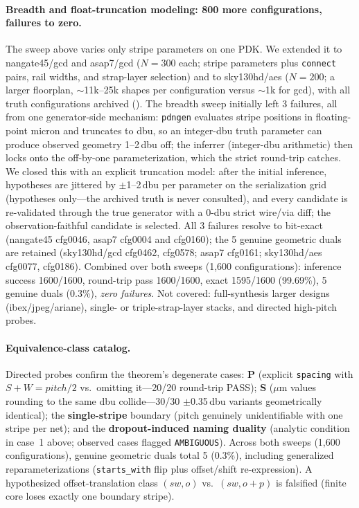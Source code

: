 \documentclass[11pt]{article}
\begin{document}
\paragraph{Breadth and float-truncation modeling: 800 more
configurations, failures to zero.}  The sweep above varies only stripe
parameters on one PDK.  We extended it to nangate45/gcd and asap7/gcd
($N=300$ each; stripe parameters plus \texttt{connect} pairs, rail
widths, and strap-layer selection) and to sky130hd/aes ($N=200$; a
larger floorplan, $\sim$11k--25k shapes per configuration versus
$\sim$1k for gcd), with all truth configurations archived
().  The breadth sweep initially left
3 failures, all from one generator-side mechanism: \texttt{pdngen}
evaluates stripe positions in floating-point micron and truncates to
dbu, so an integer-dbu truth parameter can produce observed geometry
1--2\,dbu off; the inferrer (integer-dbu arithmetic) then locks onto
the off-by-one parameterization, which the strict round-trip catches.
We closed this with an explicit truncation model: after the initial
inference, hypotheses are jittered by $\pm$1--2\,dbu per parameter on
the serialization grid (hypotheses only---the archived truth is never
consulted), and every candidate is re-validated through the true
generator with a 0-dbu strict wire/via diff; the observation-faithful
candidate is selected.  All 3 failures resolve to bit-exact (nangate45
cfg0046, asap7 cfg0004 and cfg0160); the 5 genuine geometric duals are
retained (sky130hd/gcd cfg0462, cfg0578; asap7 cfg0161; sky130hd/aes
cfg0077, cfg0186).  Combined over both sweeps (1{,}600 configurations):
inference success 1600/1600, round-trip pass 1600/1600, exact
1595/1600 (99.69\%), 5 genuine duals (0.3\%), \emph{zero failures}.
Not covered: full-synthesis larger designs (ibex/jpeg/ariane), single-
or triple-strap-layer stacks, and directed high-pitch probes.

\paragraph{Equivalence-class catalog.} Directed probes confirm the
theorem's degenerate cases: \textbf{P} (explicit \texttt{spacing} with
$S+W=\mathit{pitch}/2$ vs.\ omitting it---20/20 round-trip PASS);
\textbf{S} ($\mu$m values rounding to the same dbu collide---30/30
$\pm$0.35\,dbu variants geometrically identical); the
\textbf{single-stripe} boundary (pitch genuinely unidentifiable with one
stripe per net); and the \textbf{dropout-induced naming duality}
(analytic condition in case~1 above; observed cases flagged
\texttt{AMBIGUOUS}).  Across both sweeps (1{,}600 configurations),
genuine geometric duals total 5 (0.3\%), including generalized
reparameterizations (\texttt{starts\_with} flip plus offset/shift
re-expression).  A hypothesized offset-translation class $(sw,o)$ vs.\
$(sw,o+p)$ is falsified (finite core loses exactly one boundary stripe).
\end{document}
